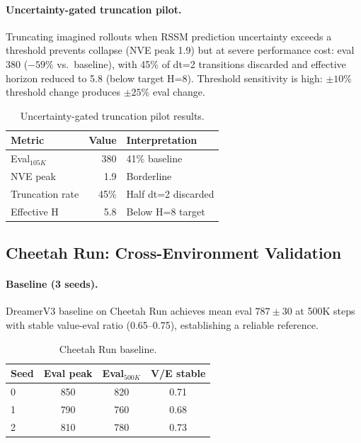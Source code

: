 \documentclass[10pt,twocolumn]{article}
\begin{document}
\paragraph{Uncertainty-gated truncation pilot.}
Truncating imagined rollouts when RSSM prediction uncertainty exceeds a threshold prevents collapse (NVE peak 1.9) but at severe performance cost: eval 380 ($-59\%$ vs.\ baseline), with 45\% of dt=2 transitions discarded and effective horizon reduced to 5.8 (below target H=8). Threshold sensitivity is high: $\pm 10\%$ threshold change produces $\pm 25\%$ eval change.

\begin{table}[h]
\centering
\caption{Uncertainty-gated truncation pilot results.}
\label{tab:truncation}
\begin{tabular}{lrl}
\toprule
Metric & Value & Interpretation \\
\midrule
Eval$_{105K}$ & 380 & 41\% baseline \\
NVE peak & 1.9 & Borderline \\
Truncation rate & 45\% & Half dt=2 discarded \\
Effective H & 5.8 & Below H=8 target \\
\bottomrule
\end{tabular}
\end{table}

\subsection{Cheetah Run: Cross-Environment Validation}
\label{sec:cheetah}

\paragraph{Baseline (3 seeds).}
DreamerV3 baseline on Cheetah Run achieves mean eval $787 \pm 30$ at 500K steps with stable value-eval ratio (0.65--0.75), establishing a reliable reference.

\begin{table}[h]
\centering
\caption{Cheetah Run baseline.}
\label{tab:cheetah-base}
\begin{tabular}{lccc}
\toprule
Seed & Eval peak & Eval$_{500K}$ & V/E stable \\
\midrule
0 & 850 & 820 & 0.71 \\
1 & 790 & 760 & 0.68 \\
2 & 810 & 780 & 0.73 \\
\bottomrule
\end{tabular}
\end{table}
\end{document}
